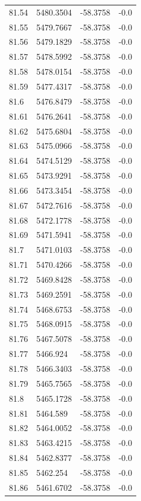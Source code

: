 \begin{table}[H]
\begin{tabular}{llll}
81.54 & 5480.3504 & -58.3758 & -0.0 \\
81.55 & 5479.7667 & -58.3758 & -0.0 \\
81.56 & 5479.1829 & -58.3758 & -0.0 \\
81.57 & 5478.5992 & -58.3758 & -0.0 \\
81.58 & 5478.0154 & -58.3758 & -0.0 \\
81.59 & 5477.4317 & -58.3758 & -0.0 \\
81.6 & 5476.8479 & -58.3758 & -0.0 \\
81.61 & 5476.2641 & -58.3758 & -0.0 \\
81.62 & 5475.6804 & -58.3758 & -0.0 \\
81.63 & 5475.0966 & -58.3758 & -0.0 \\
81.64 & 5474.5129 & -58.3758 & -0.0 \\
81.65 & 5473.9291 & -58.3758 & -0.0 \\
81.66 & 5473.3454 & -58.3758 & -0.0 \\
81.67 & 5472.7616 & -58.3758 & -0.0 \\
81.68 & 5472.1778 & -58.3758 & -0.0 \\
81.69 & 5471.5941 & -58.3758 & -0.0 \\
81.7 & 5471.0103 & -58.3758 & -0.0 \\
81.71 & 5470.4266 & -58.3758 & -0.0 \\
81.72 & 5469.8428 & -58.3758 & -0.0 \\
81.73 & 5469.2591 & -58.3758 & -0.0 \\
81.74 & 5468.6753 & -58.3758 & -0.0 \\
81.75 & 5468.0915 & -58.3758 & -0.0 \\
81.76 & 5467.5078 & -58.3758 & -0.0 \\
81.77 & 5466.924 & -58.3758 & -0.0 \\
81.78 & 5466.3403 & -58.3758 & -0.0 \\
81.79 & 5465.7565 & -58.3758 & -0.0 \\
81.8 & 5465.1728 & -58.3758 & -0.0 \\
81.81 & 5464.589 & -58.3758 & -0.0 \\
81.82 & 5464.0052 & -58.3758 & -0.0 \\
81.83 & 5463.4215 & -58.3758 & -0.0 \\
81.84 & 5462.8377 & -58.3758 & -0.0 \\
81.85 & 5462.254 & -58.3758 & -0.0 \\
81.86 & 5461.6702 & -58.3758 & -0.0 \\

\end{tabular}
\end{table}
